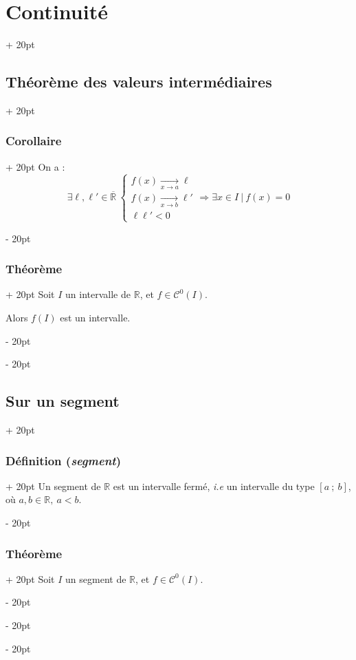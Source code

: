 \documentclass[a4paper, 12pt, twoside]{article}
\newcommand{\R}{\mathbb{R}} %
\newcommand{\seg}[2]{\left[ #1\ ;\ #2 \right]}
\newcommand{\cj}[1]{\overline{#1}} %
\newcommand{\tendsto}[1]{\xrightarrow[#1]{}}
\newcommand{\ind}[1][20pt]{\advance\leftskip + #1}
\newcommand{\deind}[1][20pt]{\advance\leftskip - #1}
\newenvironment{indt}[2][20pt]{#2 \par \ind[#1]}{\par \deind} %
\begin{document}
\begin{indt}{\section{Continuité}}
\begin{indt}{\subsection{Théorème des valeurs intermédiaires}}
\begin{indt}{\subsubsection{Corollaire}}
                On a :
                \[
                    \exists \ell, \ell' \in \cj \R\
                    \begin{cases}
                        f(x) \tendsto{x \to a} \ell
                        \\
                        f(x) \tendsto{x \to b} \ell'
                        \\
                        \ell \ell' < 0
                    \end{cases}
                    \Rightarrow \exists x \in I\ |\ f(x) = 0
                \]
            \end{indt}

            \vspace{12pt}
            
            \begin{indt}{\subsubsection{Théorème}}
                Soit $I$ un intervalle de $\R$, et $f \in \mathcal C^0(I)$.

                Alors $f(I)$ est un intervalle.
            \end{indt}
        \end{indt}

        \vspace{12pt}
        
        \begin{indt}{\subsection{Sur un segment}}
            \begin{indt}{\subsubsection{Définition (\textit{segment})}}
                Un segment de $\R$ est un intervalle fermé, \textit{i.e} un intervalle du type $\seg a b$, où $a, b \in \R,\ a < b$.
            \end{indt}

            \vspace{12pt}
            
            \begin{indt}{\subsubsection{Théorème}}
                Soit $I$ un segment de $\R$, et $f \in \mathcal C^0(I)$.


\end{indt}
\end{indt}
\end{indt}
\end{document}
